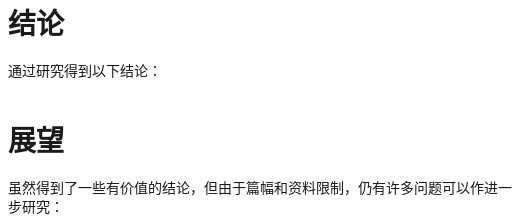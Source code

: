 
\begin{summary}
    \section*{结论}
    通过研究得到以下结论：
    \section*{展望}
    虽然得到了一些有价值的结论，但由于篇幅和资料限制，仍有许多问题可以作进一步研究：
\end{summary}